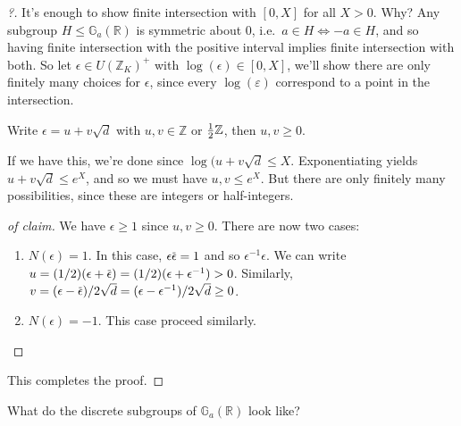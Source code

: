 \begin{proof}[?]

It's enough to show finite intersection with \([0, X]\) for all \(X>0\).
Why? Any subgroup \(H\leq {\mathbb{G}}_a({\mathbb{R}})\) is symmetric
about 0, i.e.~\(a\in H \iff -a\in H\), and so having finite intersection
with the positive interval implies finite intersection with both. So let
\(\epsilon \in U({\mathbb{Z}}_K)^+\) with
\(\log( \epsilon) \in [0, X]\), we'll show there are only finitely many
choices for \(\epsilon\), since every \(\log(\varepsilon)\) correspond
to a point in the intersection.

\begin{claim}

Write \(\epsilon = u + v \sqrt{d}\) with \(u,v \in {\mathbb{Z}}\) or
\({1\over 2}{\mathbb{Z}}\), then \(u, v \geq 0\).

\end{claim}

If we have this, we're done since \(\log( u + v \sqrt{d} \leq X\).
Exponentiating yields \(u + v\sqrt {d} \leq e^X\), and so we must have
\(u, v \leq e^X\). But there are only finitely many possibilities, since
these are integers or half-integers.

\begin{proof}[of claim]

We have \(\epsilon \geq 1\) since \(u, v \geq 0\). There are now two
cases:

\begin{enumerate}
\def\labelenumi{\arabic{enumi}.}
\item
  \(N( \epsilon) = 1\). In this case,
  \(\epsilon \mkern 1.5mu\overline{\mkern-1.5mu\epsilon \mkern-1.5mu}\mkern 1.5mu= 1\)
  and so \(\epsilon ^{-1} \epsilon\). We can write
  \(u = (1/2)( \epsilon + \mkern 1.5mu\overline{\mkern-1.5mu\epsilon\mkern-1.5mu}\mkern 1.5mu) = (1/2)(\epsilon + \epsilon ^{-1} ) > 0\).
  Similarly,
  \(v = (\epsilon - \mkern 1.5mu\overline{\mkern-1.5mu\epsilon\mkern-1.5mu}\mkern 1.5mu)/2 \sqrt{d} = (\epsilon - \epsilon ^{-1} ) / 2 \sqrt{d} \geq 0\).
\item
  \(N(\epsilon) = -1\). This case proceed similarly.
\end{enumerate}

\end{proof}

This completes the proof.

\end{proof}

\begin{question}

What do the discrete subgroups of \({\mathbb{G}}_a({\mathbb{R}})\) look
like?

\end{question}

